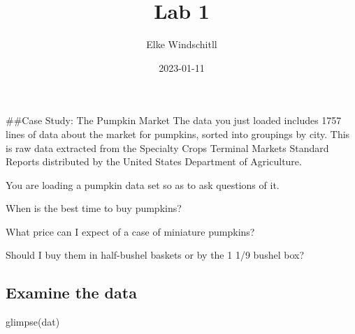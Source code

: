 \documentclass[
]{article}
\title{Lab 1}
\author{Elke Windschitll}
\date{2023-01-11}
\newenvironment{Shaded}{\begin{snugshade}}{\end{snugshade}}
\newcommand{\FunctionTok}[1]{\textcolor[rgb]{0.00,0.00,0.00}{#1}}
\newcommand{\NormalTok}[1]{#1}
\begin{document}
\maketitle

\#\#Case Study: The Pumpkin Market The data you just loaded includes
1757 lines of data about the market for pumpkins, sorted into groupings
by city. This is raw data extracted from the Specialty Crops Terminal
Markets Standard Reports distributed by the United States Department of
Agriculture.

You are loading a pumpkin data set so as to ask questions of it.

When is the best time to buy pumpkins?

What price can I expect of a case of miniature pumpkins?

Should I buy them in half-bushel baskets or by the 1 1/9 bushel box?

\hypertarget{examine-the-data}{%
\subsection{Examine the data}\label{examine-the-data}}

\begin{Shaded}
\begin{Highlighting}[]
\FunctionTok{glimpse}\NormalTok{(dat)}
\end{Highlighting}
\end{Shaded}
\end{document}
